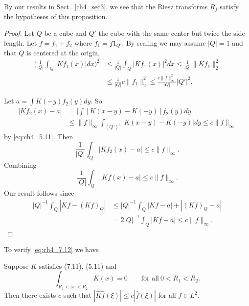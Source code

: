 By our results in Sect.\ \ref{ch4_sec3}, we see that the Riesz transforms $R_j$ satisfy the hypotheses of this proposition.

\begin{proof}
Let $Q$ be a cube and $Q'$ the cube with the same center but twice the side length. Let $f = f_1 + f_2$ where $f_1 = f1_{Q'}$. By scaling we may assume $|Q| = 1$ and that $Q$ is centered at the origin.
\begin{align*}
    \Big(\frac{1}{|Q|}\int_Q |Kf_1(x)|dx\Big)^2 &\leq \frac{1}{|Q|}\int_Q |Kf_1(x)|^2dx \leq \frac{1}{|Q|}\|Kf_1\|_2^2 \\
    &\leq \frac{1}{|Q|}c\|f_1\|_2^2 \leq \frac{c\|f\|_\infty^2}{|Q|}|Q'|^2.
\end{align*}

\mpagebreak

Let $a = \int K(-y)f_2(y)dy$. So
\begin{align*}
    |Kf_2(x) - a| &= \Big|\int[K(x-y) - K(-y)]f_2(y)dy\Big| \\
    &\leq \|f\|_\infty \int_{(Q')^c} |K(x-y) - K(-y)|dy \leq c\|f\|_\infty
\end{align*}
by \eqref{eq:ch4_5.11}. Then
\[
    \frac{1}{|Q|}\int_Q |Kf_2(x) - a| \leq c\|f\|_\infty.
\]
Combining
\[
    \frac{1}{|Q|}\int_Q |Kf(x) - a| \leq c\|f\|_\infty.
\]
Our result follows since
\begin{align*}
    |Q|^{-1}\int_Q |Kf - (Kf)_Q| &\leq |Q|^{-1}\int_Q |Kf - a| + |(Kf)_Q - a| \\
    &= 2|Q|^{-1}\int_Q |Kf - a| \leq c\|f\|_\infty.
\end{align*}
\end{proof}

To verify \eqref{eq:ch4_7.12} we have

\begin{proposition}\label{prop:ch4_7.11}
Suppose $K$ satisfies (7.11), (5.11) and
\begin{equation}\label{eq:ch4_7.13}
    \int_{R_1<|x|<R_2} K(x) = 0 \qquad \text{for all}~0 < R_1 < R_2.
\end{equation}
Then there exists $c$ such that $|\widehat{Kf}(\xi)| \leq c|\widehat{f}(\xi)|$ for all $f \in L^2$.
\end{proposition}

